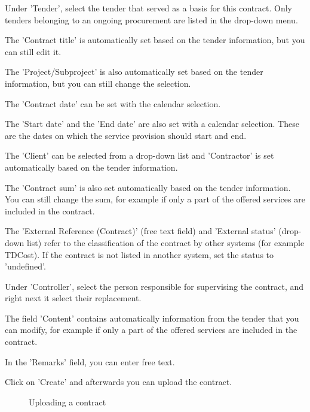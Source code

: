 \begin{compactitem}
\item {\sffamily\color{black}
Under 'Tender', select the tender that served as a basis for this contract. Only tenders belonging to an ongoing procurement are listed in the drop-down menu.}
\item
The 'Contract title' is automatically set based on the tender information, but you can still edit it.
\item
The 'Project/Subproject' is also automatically set based on the tender information, but you can still change the selection.
\item
The 'Contract date' can be set with the calendar selection.
\item
The 'Start date' and the 'End date' are also set with a calendar selection. These are the dates on which the service provision should start and end.
\item
The 'Client' can be selected from a drop-down list and 'Contractor' is set automatically based on the tender information.
\item
The 'Contract sum' is also set automatically based on the tender information. You can still change the sum, for example if only a part of the offered services are included in the contract.
\item
The 'External Reference (Contract)' (free text field) and 'External status' (drop-down list) refer to the classification of the contract by other systems (for example TDCost). If the contract is not listed in another system, set the status to 'undefined'.
\item
Under 'Controller', select the person responsible for supervising the contract, and right next it select their replacement.
\item
The field 'Content' contains automatically information from the tender that you can modify, for example if only a part of the offered services are included in the contract.
\item
In the 'Remarks' field, you can enter free text.
\end{compactitem}

\vspace{\baselineskip}

Click on 'Create'  and afterwards you can upload the contract.

\begin{figure}[H]
\caption{Uploading a contract}
\end{figure}

